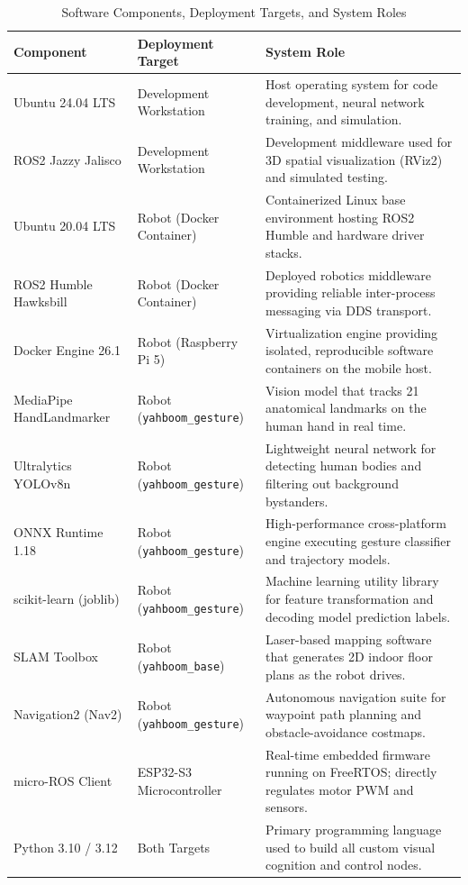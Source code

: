 \begin{table}[H]
\centering
\caption{Software Components, Deployment Targets, and System Roles}
\label{tab:software_requirements}
\renewcommand{\arraystretch}{1.15}
\begin{tabular}{|p{3.8cm}|p{3.8cm}|p{6.6cm}|}
\hline
\textbf{Component} & \textbf{Deployment Target} & \textbf{System Role} \\
\hline
Ubuntu 24.04 LTS & Development Workstation & Host operating system for code development, neural network training, and simulation. \\
\hline
ROS2 Jazzy Jalisco & Development Workstation & Development middleware used for 3D spatial visualization (RViz2) and simulated testing. \\
\hline
Ubuntu 20.04 LTS & Robot (Docker Container) & Containerized Linux base environment hosting ROS2 Humble and hardware driver stacks. \\
\hline
ROS2 Humble Hawksbill & Robot (Docker Container) & Deployed robotics middleware providing reliable inter-process messaging via DDS transport. \\
\hline
Docker Engine 26.1 & Robot (Raspberry Pi 5) & Virtualization engine providing isolated, reproducible software containers on the mobile host. \\
\hline
MediaPipe HandLandmarker & Robot (\texttt{yahboom\_gesture}) & Vision model that tracks 21 anatomical landmarks on the human hand in real time. \\
\hline
Ultralytics YOLOv8n & Robot (\texttt{yahboom\_gesture}) & Lightweight neural network for detecting human bodies and filtering out background bystanders. \\
\hline
ONNX Runtime 1.18 & Robot (\texttt{yahboom\_gesture}) & High-performance cross-platform engine executing gesture classifier and trajectory models. \\
\hline
scikit-learn (joblib) & Robot (\texttt{yahboom\_gesture}) & Machine learning utility library for feature transformation and decoding model prediction labels. \\
\hline
SLAM Toolbox & Robot (\texttt{yahboom\_base}) & Laser-based mapping software that generates 2D indoor floor plans as the robot drives. \\
\hline
Navigation2 (Nav2) & Robot (\texttt{yahboom\_gesture}) & Autonomous navigation suite for waypoint path planning and obstacle-avoidance costmaps. \\
\hline
micro-ROS Client & ESP32-S3 Microcontroller & Real-time embedded firmware running on FreeRTOS; directly regulates motor PWM and sensors. \\
\hline
Python 3.10 / 3.12 & Both Targets & Primary programming language used to build all custom visual cognition and control nodes. \\
\hline
\end{tabular}
\end{table}

